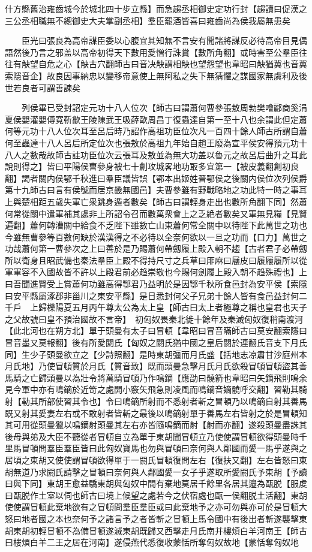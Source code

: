 什方縣舊治雍齒城今於城北四十步立縣】而急趨丞相御史定功行封【趨讀曰促漢之三公丞相職無不總御史大夫掌副丞相】羣臣罷酒皆喜曰雍齒尚為侯我屬無患矣

　　臣光曰張良為高帝謀臣委以心腹宜其知無不言安有聞諸將謀反必待高帝目見偶語然後乃言之邪盖以高帝初得天下數用愛憎行誅賞【數所角翻】或時害至公羣臣往往有觖望自危之心【觖古穴翻師古曰音决觖謂相觖也望怨望也韋昭曰觖猶冀也音冀索隱音企】故良因事納忠以變移帝意使上無阿私之失下無猜懼之謀國家無虞利及後世若良者可謂善諫矣

　　列侯畢已受封詔定元功十八人位次【師古曰謂蕭何曹參張敖周勃樊噲酈商奚涓夏侯嬰灌嬰傅寛靳歙王陵陳武王吸薛歐周昌丁復蟲達自第一至十八也余謂此但定蕭何等元功十八人位次耳至呂后時乃詔作高祖功臣位次凡一百四十餘人師古所謂自蕭何至蟲達十八人呂后所定位次也張敖於高祖九年始自趙王廢為宣平侯安得預元功十八人之數哉故師古註功臣位次云張耳及敖並為無大功盖以魯元之故呂后曲升之耳此說則得之】皆曰平陽侯曹參身被七十創攻城畧地功冣多宜第一【被皮義翻創初良翻】謁者關内侯鄂千秋進曰羣臣議皆誤【鄂本出姬姓晉鄂侯之後關内侯位次列侯爵第十九師古曰言有侯號而居京畿無國邑】夫曹參雖有野戰略地之功此特一時之事耳上與楚相距五歲失軍亡衆跳身遁者數矣【師古曰謂輕身走出也數所角翻下同】然蕭何常從關中遣軍補其處非上所詔令召而數萬衆會上之乏絶者數矣又軍無見糧【見賢遍翻】蕭何轉漕關中給食不乏陛下雖數亡山東蕭何常全關中以待陛下此萬世之功也今雖無曹參等百數何缺於漢漢得之不必待以全奈何欲以一旦之功而【口力】萬世之功哉蕭何第一曹參次之上曰善於是乃賜蕭何帶劔履上殿入朝不趨【古者君子必帶劔所以衛身且昭武備也秦法羣臣上殿不得持尺寸之兵草曰厞麻曰屨皮曰履屨履所以從軍軍容不入國故皆不許以上殿君前必趋崇敬也今賜何劍履上殿入朝不趋殊禮也】上曰吾聞進賢受上賞蕭何功雖高得鄂君乃益明於是因鄂千秋所食邑封為安平侯【索隱曰安平縣屬涿郡非甾川之東安平縣】是日悉封何父子兄弟十餘人皆有食邑益封何二千戶　上歸櫟陽夏五月丙午尊太公為太上皇【師古曰太上者極尊之稱也皇君也天子之父故號曰皇不預治國故不言帝】　初匈奴畏秦北徙十餘年及秦滅匈奴復稍南渡河【此北河也在朔方北】單于頭曼有太子曰冒頓【韋昭曰冒音瞞師古曰莫安翻索隱曰冒音墨又莫報翻】後有所愛閼氏【匈奴之閼氏猶中國之皇后閼於連翻氏音支下月氏同】生少子頭曼欲立之【少詩照翻】是時東胡彊而月氏盛【括地志凉肅甘沙庭州本月氏地】乃使冒頓質於月氏【質音致】既而頭曼急擊月氏月氏欲殺冒頓冒頓盜其善馬騎之亡歸頭曼以為壯令將萬騎冒頓乃作鳴鏑【應劭曰髐箭也韋昭曰矢鏑飛則鳴余見今軍中亦有鳴鏑於近笴之處開小竅矢飛急則凌風而鳴鏑音嫡髐呼交翻】習勒其騎射【勒其所部使習其令也】令曰鳴鏑所射而不悉射者斬之冒頓乃以鳴鏑自射其善馬既又射其愛妻左右或不敢射者皆斬之最後以鳴鏑射單于善馬左右皆射之於是冒頓知其可用從頭曼獵以鳴鏑射頭曼其左右亦皆隨鳴鏑而射【射而亦翻】遂殺頭曼盡誅其後母與弟及大臣不聽從者冒頓自立為單于東胡聞冒頓立乃使使謂冒頓欲得頭曼時千里馬冒頓問羣臣羣臣皆曰此匈奴寶馬也勿與冒頓曰奈何與人鄰國而愛一馬乎遂與之居頃之東胡又使使謂冒頓欲得單于一閼氏冒頓復問左右【復扶又翻】左右皆怒曰東胡無道乃求閼氏請擊之冒頓曰奈何與人鄰國愛一女子乎遂取所愛閼氏予東胡【予讀曰與下同】東胡王愈益驕東胡與匈奴中間有棄地莫居千餘里各居其邉為甌脱【服䖍曰甌脱作土室以伺也師古曰境上候望之處若今之伏宿處也甌一侯翻脱土活翻】東胡使使謂冒頓此棄地欲有之冒頓問羣臣羣臣或曰此棄地予之亦可勿與亦可於是冒頓大怒曰地者國之本也奈何予之諸言予之者皆斬之冒頓上馬令國中有後出者斬遂襲擊東胡東胡初輕冒頓不為備冒頓遂滅東胡既歸又西擊走月氏南并樓煩白羊河南王【師古曰樓煩白羊二王之居在河南】遂侵燕代悉復收蒙恬所奪匈奴故地【蒙恬奪匈奴地